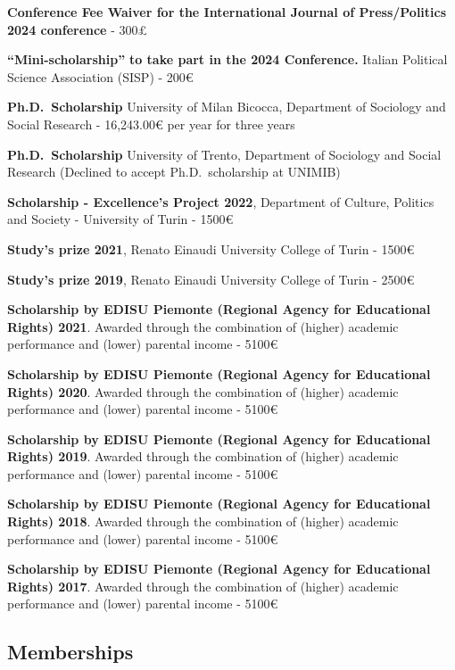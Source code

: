 \documentclass[10pt,]{article}
\renewenvironment{itemize}{
  \begin{list}{}{
    \setlength{\leftmargin}{1.5em}
  }
}{
  \end{list}
}
\begin{document}
\begin{itemize}
\item
  \textbf{Conference Fee Waiver for the International Journal of
  Press/Politics 2024 conference} - 300£
\item
  \textbf{``Mini-scholarship''} \textbf{to take part in the 2024
  Conference.} Italian Political Science Association (SISP) - 200€
\item
  \textbf{Ph.D.~Scholarship} University of Milan Bicocca, Department of
  Sociology and Social Research - 16,243.00€ per year for three years
\item
  \textbf{Ph.D.~Scholarship} University of Trento, Department of
  Sociology and Social Research (Declined to accept Ph.D.~scholarship at
  UNIMIB)
\item
  \textbf{Scholarship - Excellence's Project 2022}, Department of
  Culture, Politics and Society - University of Turin - 1500€
\item
  \textbf{Study's prize 2021}, Renato Einaudi University College of
  Turin - 1500€
\item
  \textbf{Study's prize 2019}, Renato Einaudi University College of
  Turin - 2500€
\item
  \textbf{Scholarship by EDISU Piemonte (Regional Agency for Educational
  Rights) 2021}. Awarded through the combination of (higher) academic
  performance and (lower) parental income - 5100€
\item
  \textbf{Scholarship by EDISU Piemonte (Regional Agency for Educational
  Rights) 2020}. Awarded through the combination of (higher) academic
  performance and (lower) parental income - 5100€
\item
  \textbf{Scholarship by EDISU Piemonte (Regional Agency for Educational
  Rights) 2019}. Awarded through the combination of (higher) academic
  performance and (lower) parental income - 5100€
\item
  \textbf{Scholarship by EDISU Piemonte (Regional Agency for Educational
  Rights) 2018}. Awarded through the combination of (higher) academic
  performance and (lower) parental income - 5100€
\item
  \textbf{Scholarship by EDISU Piemonte (Regional Agency for Educational
  Rights) 2017}. Awarded through the combination of (higher) academic
  performance and (lower) parental income - 5100€
\end{itemize}

\subsection{Memberships}\label{memberships}
\end{document}
